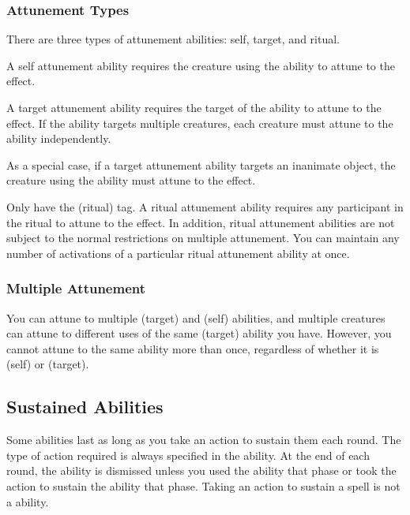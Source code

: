         \subsubsection{Attunement Types}\label{Attunement Types}
            There are three types of attunement abilities: self, target, and ritual.

             A self attunement ability requires the creature using the ability to attune to the effect.

             A target attunement ability requires the target of the ability to attune to the effect.
            If the ability targets multiple creatures, each creature must attune to the ability independently.

            As a special case, if a target attunement ability targets an inanimate object, the creature using the ability must attune to the effect.

             Only  have the  (ritual) tag.
            A ritual attunement ability requires any participant in the ritual to attune to the effect.
            In addition, ritual attunement abilities are not subject to the normal restrictions on multiple attunement.
            You can maintain any number of activations of a particular ritual attunement ability at once.

        \subsubsection{Multiple Attunement}
            You can attune to multiple  (target) and  (self) abilities, and multiple creatures can attune to different uses of the same  (target) ability you have.
            However, you cannot attune to the same ability more than once, regardless of whether it is  (self) or  (target).

    \subsection{Sustained Abilities}\label{Sustained Abilities}
        Some abilities last as long as you take an action to sustain them each round.
        The type of action required is always specified in the ability.
        At the end of each round, the ability is dismissed unless you used the ability that phase or took the action to sustain the ability that phase.
        Taking an action to sustain a spell is not a  ability.

